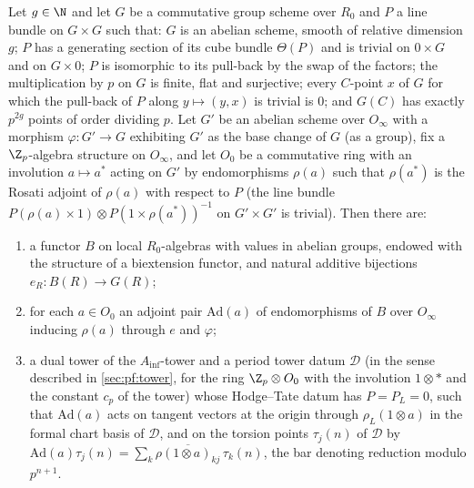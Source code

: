 \begin{theorem}\label{pf:sh-local:ptd}
Let $g\in\N$ and let $G$ be a commutative group scheme over $R_0$ and $P$ a line bundle on $G\times G$ such that: $G$
is an abelian scheme, smooth of relative dimension $g$; $P$ has a generating section of its cube bundle $\Theta(P)$ and
is trivial on $0\times G$ and on $G\times0$; $P$ is isomorphic to its pull-back by the swap of the factors; the
multiplication by $p$ on $G$ is finite, flat and surjective; every $C$-point $x$ of $G$ for which the pull-back of
$P$ along $y\mapsto(y,x)$ is trivial is $0$; and $G(C)$ has exactly $p^{2g}$ points of order dividing $p$. Let $G'$ be
an abelian scheme over $O_\infty$ with a morphism $\varphi:G'\to G$ exhibiting $G'$ as the base change of $G$ (as a
group), fix a $\Z_p$-algebra structure on $O_\infty$, and let $O_0$ be a commutative ring with an involution $a\mapsto
a^*$ acting on $G'$ by endomorphisms $\rho(a)$ such that $\rho(a^*)$ is the Rosati adjoint of $\rho(a)$ with respect to
$P$ (the line bundle $P(\rho(a)\times1)\otimes P(1\times\rho(a^*))^{-1}$ on $G'\times G'$ is trivial). Then there are:
\begin{enumerate}[label=(\roman*)]
\item a functor $B$ on local $R_0$-algebras with values in abelian groups, endowed with the structure of a biextension
functor, and natural additive bijections $e_R:B(R)\to G(R)$;
\item for each $a\in O_0$ an adjoint pair $\mathrm{Ad}(a)$ of endomorphisms of $B$ over $O_\infty$ inducing $\rho(a)$
through $e$ and $\varphi$;
\item a dual tower of the $A_{\inf}$-tower and a period tower datum $\mathcal D$ (in the sense described in
\cref{sec:pf:tower}, for the ring $\Z_p\otimes O_0$ with the involution $1\otimes*$ and the constant $c_p$ of the
tower) whose Hodge--Tate datum has $P=P_L=0$, such that $\mathrm{Ad}(a)$ acts on tangent vectors at the origin through
$\rho_L(1\otimes a)$ in the formal chart basis of $\mathcal D$, and on the torsion points
$\tau_j(n)$ of $\mathcal D$ by $\mathrm{Ad}(a)\tau_j(n)=\sum_k\overline{\rho(1\otimes a)_{kj}}\,\tau_k(n)$, the bar
denoting reduction modulo $p^{n+1}$.
\end{enumerate}
\end{theorem}

